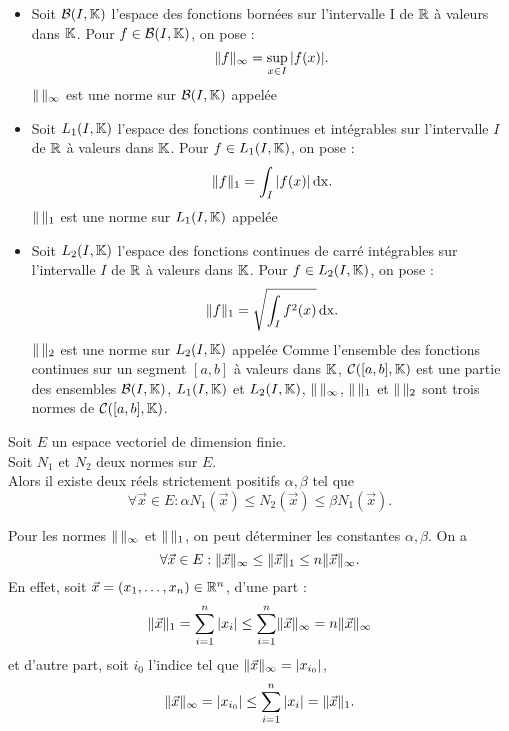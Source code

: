 \documentclass{book}
\begin{document}
\begin{Exemple}
\begin{itemize}
\item Soit $\mathcal{B}(I, \mathbb{K})$ l'espace des fonctions bornées sur l'intervalle I de $\mathbb{R}$ à valeurs dans $\mathbb{K}$.  Pour $f \in  \mathcal{B}(I, \mathbb{K})$, on pose :
$$\mathopen\lVert f \mathclose\rVert_\infty=\sup_{x\in I}|f(x)|.$$
$\mathopen\lVert \, \mathclose\rVert_\infty$ est une norme sur $\mathcal{B}(I, \mathbb{K})$ appelée 
\item Soit $L_1(I, \mathbb{K})$ l'espace des fonctions continues et intégrables sur l'intervalle $I$ de $\mathbb{R}$ à valeurs dans $\mathbb{K}$. Pour $f \in L_1(I, \mathbb{K})$, on pose :
$$\mathopen\lVert f \mathclose\rVert_1=\int_I|f(x)|\,\mathrm{dx}.$$
$\mathopen\lVert \, \mathclose\rVert_1$ est une norme sur $L_1(I, \mathbb{K})$ appelée 
\item Soit $L_2(I, \mathbb{K})$ l'espace des fonctions continues de carré intégrables sur l'intervalle $I$ de $\mathbb{R}$ à valeurs dans $\mathbb{K}$. Pour $f \in L_2(I, \mathbb{K})$, on pose :
$$\mathopen\lVert f \mathclose\rVert_1=\sqrt{\int_I f^2(x)}\,\mathrm{dx}.$$
$\mathopen\lVert \, \mathclose\rVert_2$ est une norme sur $L_2(I, \mathbb{K})$ appelée 
Comme l'ensemble des fonctions continues sur un segment $[a,b]$ à valeurs dans $\mathbb{K}$, $\mathcal{C}([a,b],\mathbb{K})$ est une partie des ensembles $\mathcal{B}(I, \mathbb{K})$, $L_1(I, \mathbb{K})$ et $L_2(I, \mathbb{K})$, $\mathopen\lVert \, \mathclose\rVert_\infty$, $\mathopen\lVert \, \mathclose\rVert_1$ et $\mathopen\lVert \, \mathclose\rVert_2$ sont trois normes de $\mathcal{C}([a,b],\mathbb{K})$.
\end{itemize}
\end{Exemple}


\begin{Theoreme}
Soit $E$ un espace vectoriel de dimension finie.\\
Soit $N_1$ et $N_2$ deux normes sur $E$.\\
Alors il existe deux réels strictement positifs $\alpha, \beta$ tel que 
$$\forall \vec{x}\in E : \alpha N_1(\vec{x})\leq N_2(\vec{x})\leq \beta N_1(\vec{x}).$$ 
\end{Theoreme}
\begin{Exemple}[$\R^n$]  
Pour les normes $\mathopen\lVert \, \mathclose\rVert_\infty$ et $\mathopen\lVert \, \mathclose\rVert_1$, on peut déterminer les constantes $\alpha, \beta$. On a  $$\forall \vec{x}\in E :  \mathopen\lVert \vec{x} \mathclose\rVert_\infty\leq \mathopen\lVert \vec{x} \mathclose\rVert_1 \leq n \mathopen\lVert \vec{x} \mathclose\rVert_\infty.$$
En effet, soit $\vec{x}=(x_1,\dots,x_n)\in \mathbb{R}^n$, d'une part :
$$\mathopen\lVert \vec{x} \mathclose\rVert_1=\sum_{i=1}^n |x_i|\leq \sum_{i=1}^n \mathopen\lVert \vec{x} \mathclose\rVert_\infty=n\mathopen\lVert \vec{x} \mathclose\rVert_\infty$$
et d'autre part, soit $i_0$ l'indice tel que $\mathopen\lVert \vec{x} \mathclose\rVert_\infty = |x_{i_0}|$,
$$\mathopen\lVert \vec{x} \mathclose\rVert_\infty=|x_{i_0}|\leq \sum_{i=1}^n |x_i| =  \mathopen\lVert \vec{x} \mathclose\rVert_1.$$
\end{Exemple}
\end{document}
